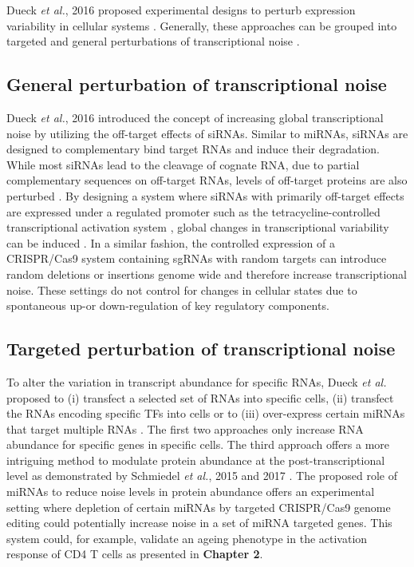 Dueck \emph{et al.}, 2016 proposed experimental designs to perturb expression variability in cellular systems \citep{Dueck2016}. Generally, these approaches can be grouped into targeted and general perturbations of transcriptional noise \citep{Dueck2016}.

\subsection{General perturbation of transcriptional noise} 

Dueck \emph{et al.}, 2016 introduced the concept of increasing global transcriptional noise by utilizing the off-target effects of \glspl{siRNA}. Similar to miRNAs, siRNAs are designed to complementary bind target RNAs and induce their degradation. While most siRNAs lead to the cleavage of cognate RNA, due to partial complementary sequences on off-target RNAs, levels of off-target proteins are also perturbed \citep{Scacheri2004}. By designing a system where siRNAs with primarily off-target effects are expressed under a regulated promoter such as the tetracycline-controlled transcriptional activation system \citep{Gossen1995}, global changes in transcriptional variability can be induced \citep{Dueck2016}. In a similar fashion, the controlled expression of a CRISPR/Cas9 system containing \glspl{sgRNA} with random targets can introduce random deletions or insertions genome wide and therefore increase transcriptional noise. These settings do not control for changes in cellular states due to spontaneous up-or down-regulation of key regulatory components. \\

\subsection{Targeted perturbation of transcriptional noise} 

To alter the variation in transcript abundance for specific RNAs, Dueck \emph{et al.} proposed to (i) transfect a selected set of RNAs into specific cells, (ii) transfect the RNAs encoding specific TFs into cells or to (iii) over-express certain miRNAs that target multiple RNAs \cite{Dueck2016}. The first two approaches only increase RNA abundance for specific genes in specific cells. The third approach offers a more intriguing method to modulate protein abundance at the post-transcriptional level as demonstrated by Schmiedel \emph{et al.}, 2015 and 2017 \cite{Schmiedel2015, Schmiedel2017}. The proposed role of miRNAs to reduce noise levels in protein abundance offers an experimental setting where depletion of certain miRNAs by targeted CRISPR/Cas9 genome editing could potentially increase noise in a set of miRNA targeted genes. This system could, for example, validate an ageing phenotype in the activation response of CD4\plus{} T cells as presented in \textbf{Chapter 2}. \\

